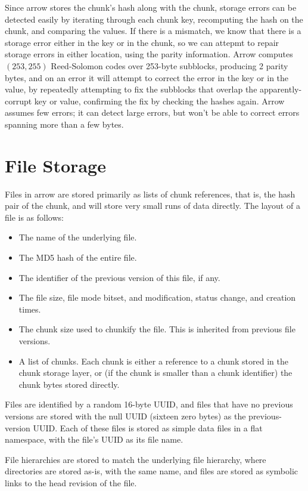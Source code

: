 \documentclass{article}
\begin{document}
Since arrow stores the chunk's hash along with the chunk, storage
errors can be detected easily by iterating through each chunk key,
recomputing the hash on the chunk, and comparing the values. If there
is a mismatch, we know that there is a storage error either in the key
or in the chunk, so we can attepmt to repair storage errors in either
location, using the parity information. Arrow computes \( (253,255) \)
Reed-Solomon codes over 253-byte subblocks, producing 2 parity bytes,
and on an error it will attempt to correct the error in the key or in
the value, by repeatedly attempting to fix the subblocks that overlap
the apparently-corrupt key or value, confirming the fix by checking
the hashes again. Arrow assumes few errors; it can detect large
errors, but won't be able to correct errors spanning more than a few
bytes.

\section{File Storage}

Files in arrow are stored primarily as lists of chunk references, that
is, the hash pair of the chunk, and will store very small runs of data
directly. The layout of a file is as follows:

\begin{itemize}
\item The name of the underlying file.
\item The MD5 hash of the entire file.
\item The identifier of the previous version of this file, if any.
\item The file size, file mode bitset, and modification, status
  change, and creation times.
\item The chunk size used to chunkify the file. This is inherited from
  previous file versions.
\item A list of chunks. Each chunk is either a reference to a chunk
  stored in the chunk storage layer, or (if the chunk is smaller than
  a chunk identifier) the chunk bytes stored directly.
\end{itemize}

Files are identified by a random 16-byte UUID, and files that have no
previous versions are stored with the null UUID (sixteen zero bytes)
as the previous-version UUID. Each of these files is stored as simple
data files in a flat namespace, with the file's UUID as its file name.

File hierarchies are stored to match the underlying file hierarchy,
where directories are stored as-is, with the same name, and files are
stored as symbolic links to the head revision of the file.
\end{document}
